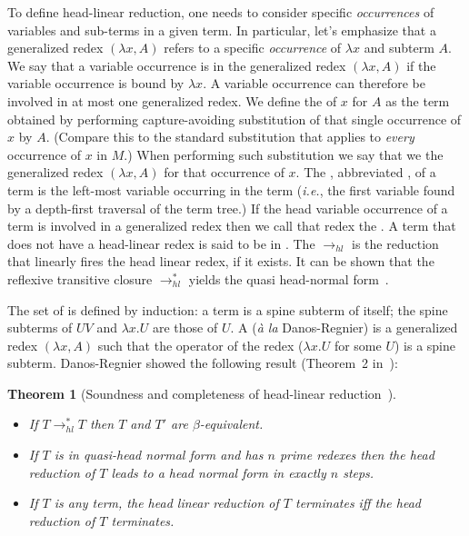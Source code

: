 \documentclass{elsarticle}
\makeatletter
\theoremstyle{plain}
\newtheorem{theorem}{Theorem}[section]
\theoremstyle{definition}
\renewcommand\ie{{\it i.e.\@\xspace}}
\newcommand{\hlred}{\rightarrow_{hl}}
\makeatother
\begin{document}
To define head-linear reduction, one needs to consider specific \emph{occurrences} of variables and sub-terms in a given term. In particular, let's emphasize that a generalized redex  $(\lambda x, A)$ refers to a specific \emph{occurrence} of $\lambda x$ and subterm $A$.
%
We say that a variable occurrence is  in the generalized redex $(\lambda x, A)$ if the variable occurrence is bound by $\lambda x$. A variable occurrence can therefore be involved in at most one generalized redex. We define the  of $x$ for $A$ as the term obtained by performing capture-avoiding substitution of that single occurrence of $x$ by $A$. (Compare this to the standard substitution that applies to \emph{every} occurrence of $x$ in $M$.) When performing such substitution we say that we  the generalized redex $(\lambda x, A)$ for that occurrence of $x$.
%
The , abbreviated , of a term is the left-most variable occurring in the term (\ie, the first variable found by a depth-first traversal of the term tree.) If the head variable occurrence of a term is involved in a generalized redex then we call that redex the .
A term that does not have a head-linear redex is said to be in .
The  $\hlred$ is the reduction that linearly fires the head linear redex, if it exists. It can be shown that the reflexive transitive closure $\rightarrow^*_{hl}$ yields the quasi head-normal form~\cite{danos-head,danosherbelinregnier1996}.

The set of  is defined by induction: a term is a spine subterm of itself; the spine subterms of $U V$ and $\lambda x. U$ are those of $U$.
A  ({\it \`a la} Danos-Regnier) is a generalized redex $(\lambda x, A)$ such that the operator of the redex ($\lambda x . U$ for some $U$) is a spine subterm. Danos-Regnier showed the following result (Theorem~2 in~\cite{danos-head}):
\begin{theorem}[Soundness and completeness of head-linear reduction~\cite{danos-head}] \
\label{thm:danosregnier_headlinred}
\begin{itemize}[nosep]
\item If $T \rightarrow^*_{hl} T$  then $T$ and $T'$ are $\beta$-equivalent.
\item If $T$ is in quasi-head normal form and has $n$ prime redexes then the head reduction of $T$ leads to a head normal form in exactly $n$ steps.
\item If $T$ is any term, the head linear reduction of $T$ terminates iff the head reduction of $T$ terminates.
\end{itemize}
\end{theorem}
\end{document}

